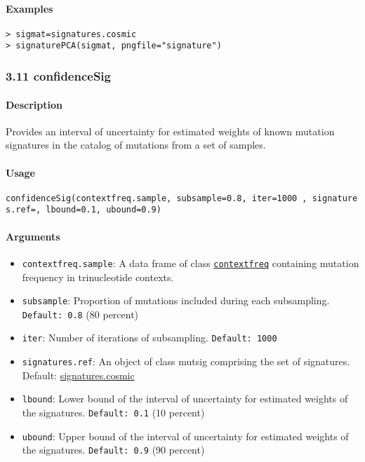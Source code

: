 \documentclass[]{article}
\providecommand{\tightlist}{%
  \setlength{\itemsep}{0pt}\setlength{\parskip}{0pt}}
\let\oldparagraph\paragraph
\renewcommand{\paragraph}[1]{\oldparagraph{#1}\mbox{}}
\begin{document}
\paragraph{\texorpdfstring{\textbf{Examples}}{Examples}}\label{examples-9}

\begin{verbatim}
> sigmat=signatures.cosmic
> signaturePCA(sigmat, pngfile="signature")
\end{verbatim}

\subsubsection{3.11 confidenceSig}\label{confidencesig}

\paragraph{\texorpdfstring{\textbf{Description}}{Description}}\label{description-9}

Provides an interval of uncertainty for estimated weights of known
mutation signatures in the catalog of mutations from a set of samples.

\paragraph{\texorpdfstring{\textbf{Usage}}{Usage}}\label{usage-10}

\texttt{confidenceSig(contextfreq.sample,\ subsample=0.8,\ iter=1000\ ,\ signatures.ref=,\ lbound=0.1,\ ubound=0.9)}

\paragraph{\texorpdfstring{\textbf{Arguments
}}{Arguments }}\label{arguments-9}

\begin{itemize}
\tightlist
\item
  \texttt{contextfreq.sample}: A data frame of class
  \protect\hyperlink{contextfreq}{\texttt{contextfreq}} containing
  mutation frequency in trinucleotide contexts.
\item
  \texttt{subsample}: Proportion of mutations included during each
  subsampling. \texttt{Default:\ 0.8} (80 percent)
\item
  \texttt{iter}: Number of iterations of subsampling.
  \texttt{Default:\ 1000}
\item
  \texttt{signatures.ref}: An object of class mutsig comprising the set
  of signatures. Default:
  \href{https://cran.r-project.org/web/packages/deconstructSigs/deconstructSigs.pdf}{signatures.cosmic}
\item
  \texttt{lbound}: Lower bound of the interval of uncertainty for
  estimated weights of the signatures. \texttt{Default:\ 0.1} (10
  percent)
\item
  \texttt{ubound}: Upper bound of the interval of uncertainty for
  estimated weights of the signatures. \texttt{Default:\ 0.9} (90
  percent)
\end{itemize}
\end{document}
